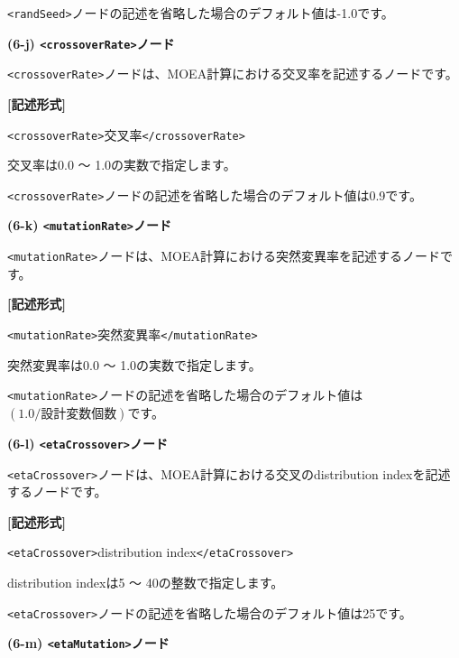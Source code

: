 \documentclass[a4paper,11pt]{jarticle}
\begin{document}
{\texttt{<randSeed>}ノードの記述を省略した場合のデフォルト値は-1.0です。

\vspace{12pt}
\textbf{(6-j) \texttt{<crossoverRate>}ノード}

\texttt{<crossoverRate>}ノードは、MOEA計算における交叉率を記述するノードです。

\vspace{8pt}
\leftskip=12pt
\textbf{[記述形式]}

\leftskip=42pt
\texttt{<crossoverRate>}交叉率\texttt{</crossoverRate>}

\vspace{8pt}
\leftskip=0pt
交叉率は0.0 〜 1.0の実数で指定します。

\texttt{<crossoverRate>}ノードの記述を省略した場合のデフォルト値は0.9です。

\vspace{12pt}
\textbf{(6-k) \texttt{<mutationRate>}ノード}

\texttt{<mutationRate>}ノードは、MOEA計算における突然変異率を記述するノードです。

\vspace{8pt}
\leftskip=12pt
\textbf{[記述形式]}

\leftskip=42pt
\texttt{<mutationRate>}突然変異率\texttt{</mutationRate>}

\vspace{8pt}
\leftskip=0pt
突然変異率は0.0 〜 1.0の実数で指定します。

\texttt{<mutationRate>}ノードの記述を省略した場合のデフォルト値は$(1.0 / 設計変数個数)$です。

\vspace{12pt}
\textbf{(6-l) \texttt{<etaCrossover>}ノード}

\texttt{<etaCrossover>}ノードは、MOEA計算における交叉のdistribution indexを記述するノードです。

\vspace{8pt}
\leftskip=12pt
\textbf{[記述形式]}

\leftskip=42pt
\texttt{<etaCrossover>}distribution index\texttt{</etaCrossover>}

\vspace{8pt}
\leftskip=0pt
distribution indexは5 〜 40の整数で指定します。

\texttt{<etaCrossover>}ノードの記述を省略した場合のデフォルト値は25です。

\vspace{12pt}
\textbf{(6-m) \texttt{<etaMutation>}ノード}

}
\end{document}

